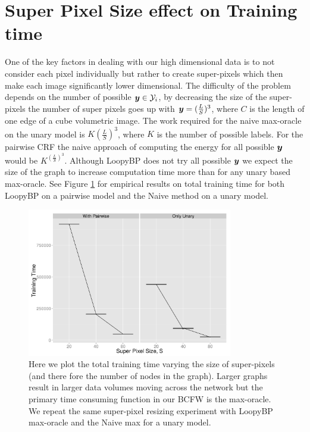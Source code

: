 \section{Super Pixel Size effect on Training time}
One of the key factors in dealing with our high dimensional data is to not consider each pixel individually but rather to create super-pixels which then make each image significantly lower dimensional. 
The difficulty of the problem depends on the number of possible $\bm{y} \in \mathcal{Y}_i$, by decreasing the size of the super-pixels the number of super pixels goes up with $
\bm{y} = (\frac{L}{S})^3$, where $C$ is the length of one edge of a cube volumetric image. The work required for the naive max-oracle on the unary model is $K(\frac{L}{S})^3$, where $K$ is the number of possible labels. For the pairwise CRF the naive approach of computing the energy for all possible $\bm{y}$ would be $K^{(\frac{L}{S})^3}$. Although LoopyBP does not try all possible $\bm{y}$ we expect the size of the graph to increase computation time more than for any unary based max-oracle. See Figure \ref{fig:superPixelSpeedup} for empirical results on total training time for both LoopyBP on a pairwise model and the Naive method on a unary model.
%
\begin{figure}
  \centering
  \includegraphics[width=0.8\textwidth]{images/SuperPixel_Speed_up.png}
  \caption{ Here we plot the total training time varying the size of super-pixels (and there fore the number of nodes in the graph). Larger graphs result in larger data volumes moving across the network but the primary time consuming function in our BCFW is the max-oracle. We repeat the same super-pixel resizing experiment with LoopyBP max-oracle and the Naive max for a unary model.} 
  \label{fig:superPixelSpeedup}
\end{figure} 
%



